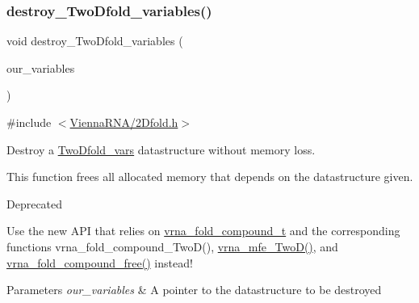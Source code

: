 \subsubsection{\texorpdfstring{destroy\+\_\+\+Two\+Dfold\+\_\+variables()}{destroy\_TwoDfold\_variables()}}
{\footnotesize\ttfamily void destroy\+\_\+\+Two\+Dfold\+\_\+variables (\begin{DoxyParamCaption}\item[{\hyperlink{group__kl__neighborhood__mfe_structTwoDfold__vars}{Two\+Dfold\+\_\+vars} $\ast$}]{our\+\_\+variables }\end{DoxyParamCaption})}



{\ttfamily \#include $<$\hyperlink{2Dfold_8h}{Vienna\+R\+N\+A/2\+Dfold.\+h}$>$}



Destroy a \hyperlink{group__kl__neighborhood__mfe_structTwoDfold__vars}{Two\+Dfold\+\_\+vars} datastructure without memory loss. 

This function free\textquotesingle{}s all allocated memory that depends on the datastructure given.

\begin{DoxyRefDesc}{Deprecated}
\item[\hyperlink{deprecated__deprecated000003}{Deprecated}]Use the new A\+PI that relies on \hyperlink{group__fold__compound_ga1b0cef17fd40466cef5968eaeeff6166}{vrna\+\_\+fold\+\_\+compound\+\_\+t} and the corresponding functions vrna\+\_\+fold\+\_\+compound\+\_\+\+Two\+D(), \hyperlink{group__kl__neighborhood__mfe_ga243c288b463147352829df04de6a2f77}{vrna\+\_\+mfe\+\_\+\+Two\+D()}, and \hyperlink{group__fold__compound_ga576a077b418a9c3650e06f8e5d296fc2}{vrna\+\_\+fold\+\_\+compound\+\_\+free()} instead!\end{DoxyRefDesc}



\begin{DoxyParams}{Parameters}
{\em our\+\_\+variables} & A pointer to the datastructure to be destroyed \\
\hline
\end{DoxyParams}
\mbox{\label{group__kl__neighborhood__mfe_ga7fc5e3e92fe97914ca4eccd33c01c2a7}} 
